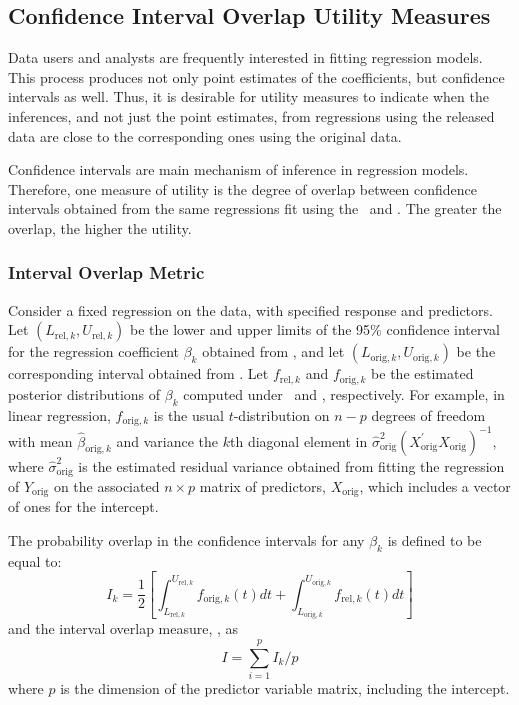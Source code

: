 \documentclass[12pt]{article}
\begin{document}
\subsection{Confidence Interval Overlap Utility Measures}\label{subsec.ci}

Data users and analysts  are frequently interested in fitting regression models. 
This process produces not only point estimates of the coefficients, but
confidence intervals as well. Thus, it is desirable for utility measures 
to indicate when the inferences, and
not just the point estimates, from regressions using the released
data are close to the corresponding ones using the original data.

Confidence intervals are main mechanism of inference in regression
models. Therefore, one measure of utility is the degree of overlap
between confidence intervals obtained from the same regressions
fit using the \DBREL\ and \DBORIG. The greater the overlap, the
higher the utility.

\subsubsection{Interval Overlap Metric}
Consider a fixed regression on the data, with specified response
and predictors. Let $(L_{\mathrm{rel},k}, U_{\mathrm{rel},k})$ be
the lower and upper limits of the 95\% confidence interval for the
regression coefficient $\beta_{k}$ obtained from \DBREL, and let
$(L_{\mathrm{orig},k}, U_{\mathrm{orig},k})$ be the corresponding
interval obtained from \DBORIG. Let $f_{\mathrm{rel},k}$ and
$f_{\mathrm{orig},k}$ be the estimated posterior distributions of
$\beta_k$ computed under \DBREL\ and \DBORIG, respectively.  For
example, in linear regression, $f_{\mathrm{orig},k}$ is the usual
$t$-distribution on $n-p$ degrees of freedom with mean
$\hat{\beta}_{\mathrm{orig},k}$ and variance the $k$th diagonal
element in
$\hat{\sigma}^2_{\mathrm{orig}}\left(X^{'}_{\mathrm{orig}}
X_{\mathrm{orig}}\right)^{-1}$, where
$\hat{\sigma}^2_{\mathrm{orig}}$ is the estimated residual
variance obtained from fitting the regression of
$Y_{\mathrm{orig}}$ on the associated $n \times p$ matrix of
predictors, $X_{\mathrm{orig}}$, which includes a vector of ones
for the intercept.

The probability overlap in the confidence intervals for
any $\beta_{k}$ \citep{kkors06} is defined to be equal to:
\begin{equation}
I_k = \frac{1}{2}
\left[\int_{L_{\mathrm{rel},k}}^{U_{\mathrm{rel},k}}
f_{\mathrm{orig},k}(t) dt +
\int_{L_{\mathrm{orig},k}}^{U_{\mathrm{orig},k}}
f_{\mathrm{rel},k}(t) dt \right]
\end{equation}
and the interval overlap measure, \IO, as
\begin{equation}
I = \sum_{i=1}^p I_k / p
\end{equation}
where $p$ is the dimension of the predictor variable matrix, including
the intercept.
\end{document}
